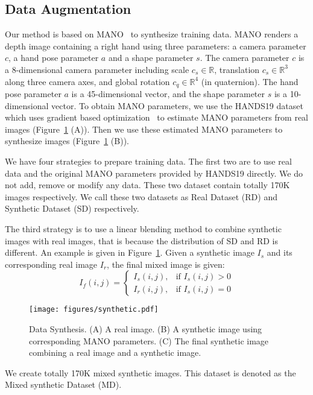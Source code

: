 \documentclass{article}
\begin{document}
\subsection{Data Augmentation}\label{sec:augment}
Our method is based on MANO~\cite{romero2017embodied} to synthesize training data. MANO renders a depth image containing a right hand using three parameters: a camera parameter $c$, a hand pose parameter $a$ and a shape parameter $s$. The camera parameter $c$ is a 8-dimensional camera parameter including scale $c_s\in \mathbb{R}$, translation $c_s\in \mathbb{R}^3$ along three camera axes, and global rotation $c_q\in \mathbb{R}^4$ (in quaternion). The hand pose parameter $a$ is a 45-dimensional vector, and the shape parameter $s$ is a 10-dimensional vector.
To obtain MANO parameters, we use the HANDS19 dataset which uses gradient based optimization~\cite{baek2019pushing} to estimate MANO parameters from real images (Figure~\ref{fig:Synthetic} (A)). Then we use these estimated MANO parameters to synthesize images (Figure~\ref{fig:Synthetic} (B)). 

We have four strategies to prepare training data. 
The first two are to use real data and the original MANO parameters provided by HANDS19 directly. We do not add, remove or modify any data. These two dataset contain totally 170K images respectively. We call these two datasets as Real Dataset (RD) and Synthetic Dataset
(SD) respectively. 

The third strategy is to use a linear blending method to combine synthetic images with real images, that is because the distribution of SD and RD is different. An example is given in Figure~\ref{fig:Synthetic}. 
Given a synthetic image $I_s$ and its corresponding real image $I_r$, the final mixed image is given:
\begin{equation}
    I_{f}(i,j) = \begin{cases} I_s(i,j), & \mbox{if } I_s(i,j)>0 \\ I_r(i,j), & \mbox{if } I_s(i,j)=0 \end{cases}
\end{equation}
\begin{figure}[t]
	\centering
	\texttt{[image: figures/synthetic.pdf]}
	\caption{Data Synthesis. (A) A real image. (B) A synthetic image using corresponding MANO parameters. (C) The final synthetic image combining a real image and a synthetic image.}
	\label{fig:Synthetic} 
\end{figure}
We create totally 170K mixed synthetic images. This dataset is denoted as the Mixed synthetic Dataset (MD).
\end{document}
